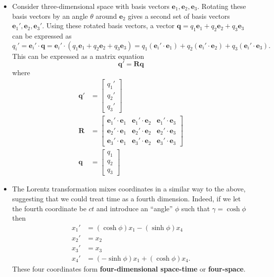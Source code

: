 \documentclass{article}
\renewcommand{\vec}[1]{\boldsymbol{\mathbf{#1}}}
\begin{document}
\begin{itemize}
  \item Consider three-dimensional space with basis vectors $\vec{e}_1, \vec{e}_2, \vec{e}_3$. Rotating these basis vectors by an angle $\theta$ around $\vec{e}_2$ gives a second set of basis vectors $\vec{e}_1', \vec{e}_2, \vec{e}_3'$. Using these rotated basis vectors, a vector $\vec{q} = q_1 \vec{e}_1 + q_2 \vec{e}_2 + q_3 \vec{e}_3$ can be expressed as \[q_i' = \vec{e}_i' \cdot \vec{q} = \vec{e}_i' \cdot (q_1 \vec{e}_1 + q_2 \vec{e}_2 + q_3 \vec{e}_3) = q_1 (\vec{e}_i' \cdot \vec{e}_1) + q_2 (\vec{e}_i' \cdot \vec{e}_2) + q_3 (\vec{e}_i' \cdot \vec{e}_3).\] This can be expressed as a matrix equation \[\vec{q}' = \vec{R} \vec{q}\] where \begin{align*}
          \vec{q}' & = \begin{bmatrix}
                         q_1' \\
                         q_2' \\
                         q_3'
                       \end{bmatrix}                                                                       \\
          \vec{R}  & = \begin{bmatrix}
                         \vec{e}_1' \cdot \vec{e}_1 & \vec{e}_1' \cdot \vec{e}_2 & \vec{e}_1' \cdot \vec{e}_3 \\
                         \vec{e}_2' \cdot \vec{e}_1 & \vec{e}_2' \cdot \vec{e}_2 & \vec{e}_2' \cdot \vec{e}_3 \\
                         \vec{e}_3' \cdot \vec{e}_1 & \vec{e}_3' \cdot \vec{e}_2 & \vec{e}_3' \cdot \vec{e}_3
                       \end{bmatrix} \\
          \vec{q}  & = \begin{bmatrix}
                         q_1 \\
                         q_2 \\
                         q_3
                       \end{bmatrix}
        \end{align*}

  \item The Lorentz transformation mixes coordinates in a similar way to the above, suggesting that we could treat time as a fourth dimension. Indeed, if we let the fourth coordinate be $c t$ and introduce an ``angle'' $\phi$ such that $\gamma = \cosh \phi$ then \begin{align*}
          x_1' & = (\cosh \phi) x_1 - (\sinh \phi) x_4   \\
          x_2' & = x_2                                   \\
          x_3' & = x_3                                   \\
          x_4' & = (-\sinh \phi) x_1 + (\cosh \phi) x_4.
        \end{align*} These four coordinates form \textbf{four-dimensional space-time} or \textbf{four-space}.


\end{itemize}
\end{document}
